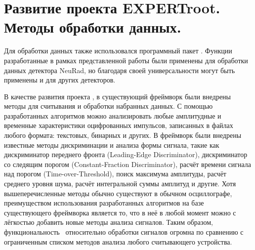 \section{Развитие проекта EXPERTroot. Методы обработки данных.}
\label{section:processing}



Для обработки данных также использовался программный пакет \er.
Функции разработанные в рамках представленной работы были применены для обработки данных детектора NeuRad, но благодаря своей универсальности могут быть применены и для других детекторов.

В качестве развития проекта \er, в существующий фреймворк были внедрены методы для считывания и обработки набранных данных. С помощью разработанных алгоритмов можно анализировать любые амплитудные и временные характеристики оцифрованных импульсов, записанных в файлах любого формата: текстовых, бинарных и других. В фреймворк были внедрены известные методы дискриминации и анализа формы сигнала, такие как дискриминатор переднего фронта (Leading-Edge Discriminator), дискриминатор со следящим порогом (Constant-Fraction Discriminator), расчёт времени сигнала над порогом (Time-over-Threshold), поиск максимума амплитуды, расчёт среднего уровня шума, расчёт интегральной суммы амплитуд и другие. Хотя вышеперечисленные методы обычно существуют в обычном осциллографе, преимуществом использования разработанных алгоритмов на базе существующего фреймворка является то, что в неё в любой момент можно с лёгкостью добавить новые методы анализа сигналов. Таким образом, функциональность \er\ относительно обработки сигналов огромна по сравнению с ограниченным списком методов анализа любого считывающего устройства. 


